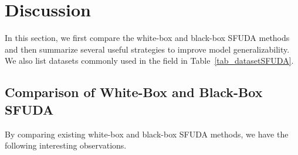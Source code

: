 \documentclass[10pt,journal,compsoc]{IEEEtran}
\begin{document}
\section{Discussion}\label{sec_discussion}
In this section, we first compare the white-box and black-box SFUDA methods and then summarize several useful strategies to improve model generalizability. 
We also list datasets commonly used in the field in Table~\ref{tab_datasetSFUDA}.

\subsection{Comparison of White-Box and Black-Box SFUDA}
By comparing existing white-box and black-box SFUDA methods, we have the following interesting observations. 
\end{document}
